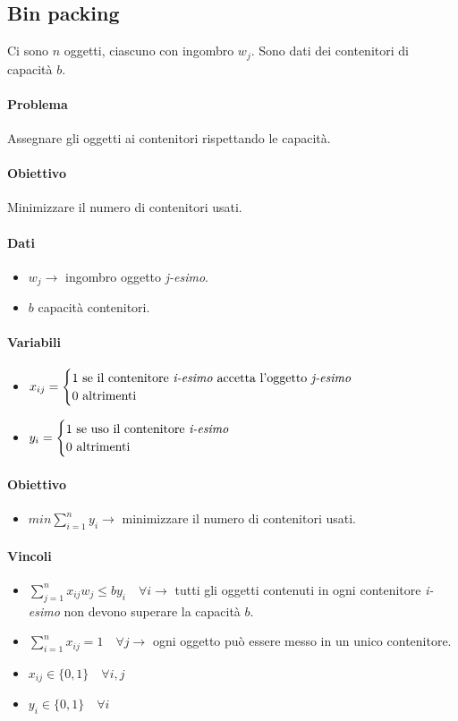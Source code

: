 \documentclass[12pt, twoside, letterpaper]{article}
\newcommand{\problemai}[5]{
	#1
	\begin{dati}
		\paragraph{Dati} 
			\begin{itemize}
				#2
			\end{itemize}
	\end{dati}
	\begin{variabili}
		\paragraph{Variabili} 
			\begin{itemize}
				#3
			\end{itemize}
	\end{variabili}
	\begin{obiettivo}
		\paragraph{Obiettivo} 
			\begin{itemize}
				#4
			\end{itemize}
	\end{obiettivo}
	\begin{vincoli}
		\paragraph{Vincoli}
			\begin{itemize}
				#5
			\end{itemize}
	\end{vincoli}
}
\begin{document}
		\subsection{Bin packing}
			\problemai{Ci sono $n$ oggetti, ciascuno con ingombro $w_j$. Sono dati dei contenitori di capacità $b$.
			
			\paragraph{Problema} Assegnare gli oggetti ai contenitori rispettando le capacità.
			\paragraph{Obiettivo} Minimizzare il numero di contenitori usati.
			}{
				\item $w_j \rightarrow$ ingombro oggetto \textit{j-esimo}.
				\item $b$ capacità contenitori. 
			}{
				\item $x_{ij} = \begin{cases} \text{1 se il contenitore \textit{i-esimo} accetta l'oggetto \textit{j-esimo}} \\ \text{0 altrimenti} \end{cases}$ 
				\item $y_i = \begin{cases} \text{1 se uso il contenitore \textit{i-esimo}} \\ \text{0 altrimenti} \end{cases}$ 
			}{
				\item $min \sum_{i=1}^n y_i \rightarrow$ minimizzare il numero di contenitori usati.
			}{
				\item $\sum_{j=1}^n x_{ij} w_j \leq b y_i \quad \forall i \rightarrow$ tutti gli oggetti contenuti in ogni contenitore \textit{i-esimo} non devono superare la capacità $b$.
				\item $\sum_{i=1}^n x_{ij} = 1 \quad \forall j \rightarrow$ ogni oggetto può essere messo in un unico contenitore.
				\item $x_{ij} \in \{0,1\} \quad \forall i,j$
				\item $y_i \in \{0,1\} \quad \forall i$
			}
		
\end{document}
